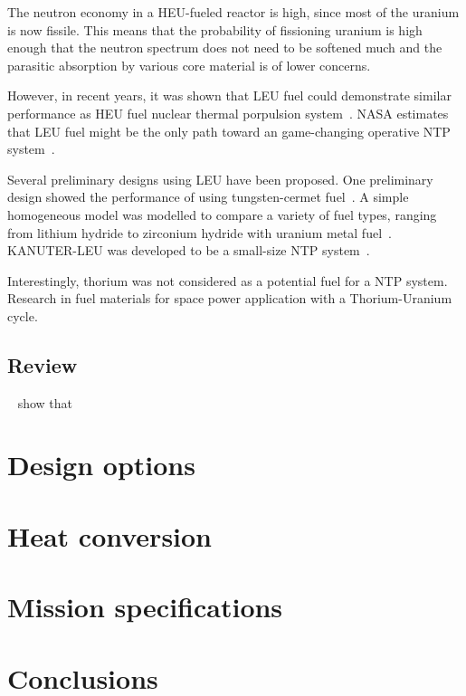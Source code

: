 \documentclass[IJPHM, 2017, 29]{PHMSociety}
\begin{document}
The neutron economy in a HEU-fueled reactor is high, since most of the uranium is now fissile. This means that the probability of fissioning uranium is high enough that the neutron spectrum does not need to be softened much and the parasitic absorption by various core material is of lower concerns.

However, in recent years, it was shown that LEU fuel could demonstrate similar performance as HEU fuel nuclear thermal porpulsion system~\citep{ii2016engine,patel2016comparing}. NASA estimates that LEU fuel might be the only path toward an game-changing operative NTP system~\citep{houts2017low}.

Several preliminary designs using LEU have been proposed. One preliminary design showed the performance of using tungsten-cermet fuel~\citep{venneri2013nuclear}. A simple homogeneous model was modelled to compare a variety of fuel types, ranging from lithium hydride to zirconium hydride with uranium metal fuel~\citep{lee2015neutronic}. KANUTER-LEU was developed to be a small-size NTP system~\citep{nam2016preliminary}.

Interestingly, thorium was not considered as a potential fuel for a NTP system. Research in fuel materials for space power application with a Thorium-Uranium cycle.


\subsection{Review}

~\cite{patel2016comparing} show that 

\section{Design options}



\section{Heat conversion}



\section{Mission specifications}




\section{Conclusions}
\end{document}
